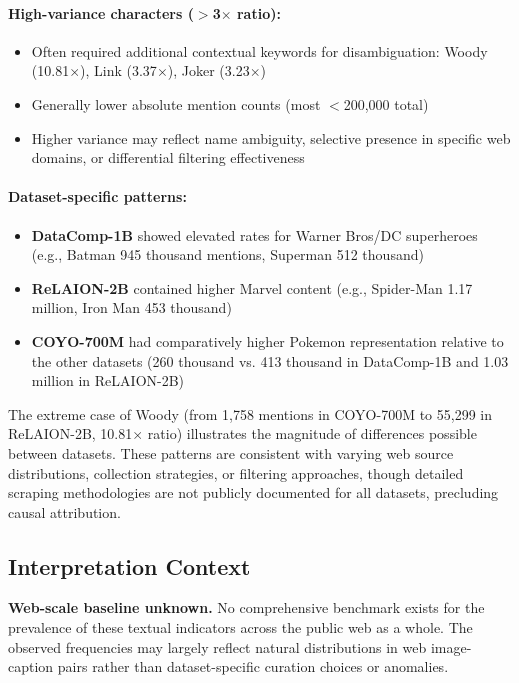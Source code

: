 \documentclass[11pt]{article}
\begin{document}
\paragraph{High-variance characters ($>$3$\times$ ratio):}
\begin{itemize}
\item Often required additional contextual keywords for disambiguation: Woody (10.81$\times$), Link (3.37$\times$), Joker (3.23$\times$)
\item Generally lower absolute mention counts (most $<$200,000 total)
\item Higher variance may reflect name ambiguity, selective presence in specific web domains, or differential filtering effectiveness
\end{itemize}

\paragraph{Dataset-specific patterns:}
\begin{itemize}
\item \textbf{DataComp-1B} showed elevated rates for Warner Bros/DC superheroes (e.g., Batman 945 thousand mentions, Superman 512 thousand)
\item \textbf{ReLAION-2B} contained higher Marvel content (e.g., Spider-Man 1.17 million, Iron Man 453 thousand)
\item \textbf{COYO-700M} had comparatively higher Pokemon representation relative to the other datasets (260 thousand vs. 413 thousand in DataComp-1B and 1.03 million in ReLAION-2B)
\end{itemize}

The extreme case of Woody (from 1,758 mentions in COYO-700M to 55,299 in ReLAION-2B, 10.81$\times$ ratio) illustrates the magnitude of differences possible between datasets. These patterns are consistent with varying web source distributions, collection strategies, or filtering approaches, though detailed scraping methodologies are not publicly documented for all datasets, precluding causal attribution.

\subsection{Interpretation Context}
\textbf{Web-scale baseline unknown.} No comprehensive benchmark exists for the prevalence of these textual indicators across the public web as a whole. The observed frequencies may largely reflect natural distributions in web image-caption pairs rather than dataset-specific curation choices or anomalies.
\end{document}
